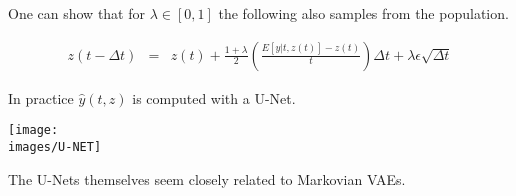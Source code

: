 {
One can show that for $\lambda \in [0,1]$ the following also samples from the population.

\begin{eqnarray*}
z(t -\Delta t) & = & z(t) + \frac{1+\lambda}{2}\left(\frac{E[y|t,z(t)] - z(t)}{t}\right)\Delta t + \lambda \epsilon\sqrt{\Delta t}
\end{eqnarray*}



\vfill
In practice $\hat{y}(t,z)$ is computed with a U-Net.

\vfill
\centerline{\texttt{[image: \\images/U-NET]}}

\vfill
The U-Nets themselves seem closely related to Markovian VAEs.

}


